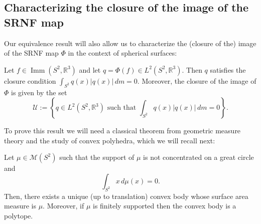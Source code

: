 \documentclass[final,hidelinks,onefignum,onetabnum]{siamart220329}
\newcommand{\R}{\mathbb{R}}
\newcommand{\Imm}{\operatorname{Imm}}
\begin{document}
\subsection{Characterizing the closure of the image of the SRNF map}
Our equivalence result will also allow us to characterize the (closure of the) image of the SRNF map $\Phi$ in the context of spherical surfaces:
\begin{theorem}\label{thm:image}
Let $f\in\Imm(S^2,\mathbb R^3)$ and let $q=\Phi(f)\in L^2(S^2,\R^3)$.
Then $q$ satisfies the closure condition $\int_{S^2}q(x)|q(x)|\,dm=0$.
Moreover, the closure of the image of $\Phi$ is  given by the set
    \[\mathcal{U}:=\left\{ q\in L^2(S^2,\R^3) \text{ such that } \int_{S^2}q(x)|q(x)|\,dm=0\right\}.\]
\end{theorem}
To prove this result we will need a classical theorem from geometric measure theory and the study of convex polyhedra, which we will recall next:
\begin{theorem}\label{mink}
Let $\mu\in \mathcal{M}(S^2)$ such that the support of $\mu$ is not concentrated on a great circle and \begin{equation*}
    \int_{S^2}x\,d\mu(x)=0.
\end{equation*}
Then, there exists a unique (up to translation) convex body whose surface area measure is $\mu$. Moreover, if $\mu$ is finitely supported then the convex body is a polytope.
\end{theorem}
\end{document}
